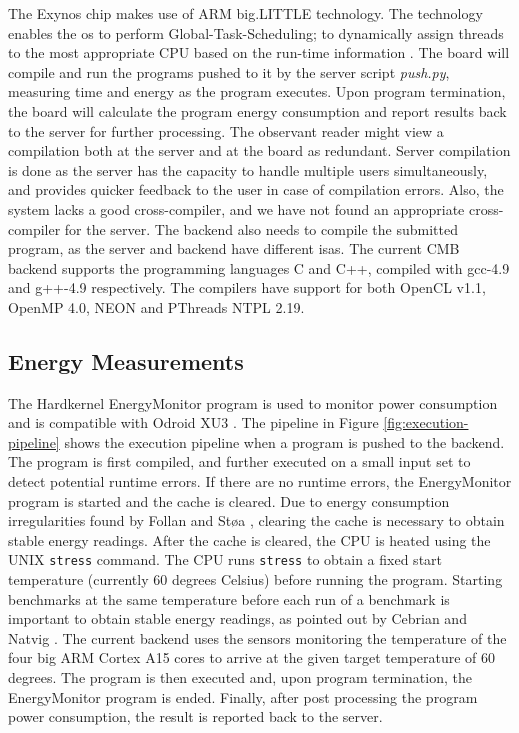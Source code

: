 The Exynos chip makes use of ARM big.LITTLE technology. The technology enables the \gls{os} to perform Global-Task-Scheduling; to dynamically assign threads to the most appropriate CPU based on the run-time information \cite{ABL}. The board will compile and run the programs pushed to it by the server script \textit{push.py}, measuring time and energy as the program executes. Upon program termination, the board will calculate the program energy consumption and report results back to the server for further processing. The observant reader might view a compilation both at the server and at the board as redundant. Server compilation is done as the server has the capacity to handle multiple users simultaneously, and provides quicker feedback to the user in case of compilation errors. Also, the system lacks a good cross-compiler, and we have not found an appropriate cross-compiler for the server. The backend also needs to compile the submitted program, as the server and backend have different \gls{isa}s. The current CMB backend supports the programming languages C and C++, compiled with gcc-4.9 and g++-4.9 respectively. The compilers have support for both OpenCL v1.1, OpenMP 4.0, NEON and PThreads NTPL 2.19.


\subsection{Energy Measurements}
\label{sec:em-cmb}
The Hardkernel EnergyMonitor program is used to monitor power consumption and is compatible with Odroid XU3 \cite{OEM}. The pipeline in Figure \ref{fig:execution-pipeline} shows the execution pipeline when a program is pushed to the backend. The program is first compiled, and further executed on a small input set to detect potential runtime errors. If there are no runtime errors, the EnergyMonitor program is started and the cache is cleared. Due to energy consumption irregularities found by Follan and Støa \cite{mt:T&S}, clearing the cache is necessary to obtain stable energy readings. After the cache is cleared, the CPU is heated using the UNIX \texttt{stress} \cite{STRESS} command. The CPU runs \texttt{stress} to obtain a fixed start temperature (currently 60 degrees Celsius) before running the program. Starting benchmarks at the same temperature before each run of a benchmark is important to obtain stable energy readings, as pointed out by Cebrian and Natvig \cite{a:JL:T}. The current backend uses the sensors monitoring the temperature of the four big ARM Cortex A15 cores to arrive at the given target temperature of 60 degrees. The program is then executed and, upon program termination, the EnergyMonitor program is ended. Finally, after post processing the program power consumption, the result is reported back to the server. \\


